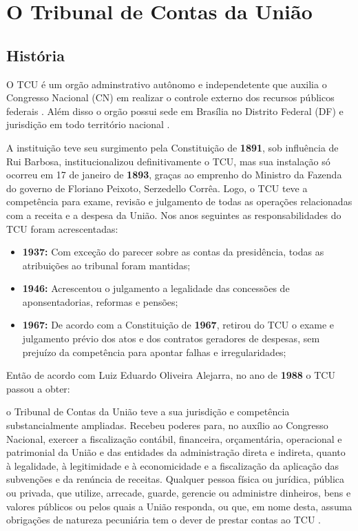 \chapter[O Tribunal de Contas da União]{O Tribunal de Contas da União}

\section{História}
O TCU é um orgão adminstrativo autônomo e independetente que auxilia o Congresso Nacional (CN) em realizar o controle externo dos recursos públicos federais \cite{TCUHistoria}. Além disso o orgão possui sede em Brasília no Distrito Federal (DF) e jurisdição em todo território nacional \cite{Art73}. 

A instituição teve seu surgimento pela Constituição de \textbf{1891}, sob influência de Rui Barbosa, institucionalizou definitivamente o TCU, mas sua instalação só ocorreu em 17 de janeiro de \textbf{1893}, graças ao emprenho do Ministro da Fazenda do governo de Floriano Peixoto, Serzedello Corrêa\cite{TCUHistoriaJUS}. Logo, o TCU teve a competência para exame, revisão e julgamento de todas as operações relacionadas com a receita e a despesa da União. Nos anos seguintes as responsabilidades do TCU foram acrescentadas\cite{TCUHistoriaJUS}:

\begin{itemize}
	\item \textbf{1937:} Com exceção do parecer sobre as contas da presidência, todas as atribuições ao tribunal foram mantidas;
	
	\item \textbf{1946:} Acrescentou o julgamento a legalidade das concessões de aponsentadorias, reformas e pensões;
	
	\item \textbf{1967:} De acordo com a Constituição de \textbf{1967}, retirou do TCU o exame e julgamento prévio dos atos e dos contratos geradores de despesas, sem prejuízo da competência para apontar falhas e irregularidades; 
\end{itemize}

Então de acordo com Luiz Eduardo Oliveira Alejarra, no ano de \textbf{1988} o TCU passou a obter: 

\begin{citacao}
	o Tribunal de Contas da União teve a sua jurisdição e competência substancialmente ampliadas. Recebeu poderes para, no auxílio ao Congresso Nacional, exercer a fiscalização contábil, financeira, orçamentária, operacional e patrimonial da União e das entidades da administração direta e indireta, quanto à legalidade, à legitimidade e à economicidade e a fiscalização da aplicação das subvenções e da renúncia de receitas. Qualquer pessoa física ou jurídica, pública ou privada, que utilize, arrecade, guarde, gerencie ou administre dinheiros, bens e valores públicos ou pelos quais a União responda, ou que, em nome desta, assuma obrigações de natureza pecuniária tem o dever de prestar contas ao TCU \cite[p. 1]{TCUHistoriaJUS}.
\end{citacao}

